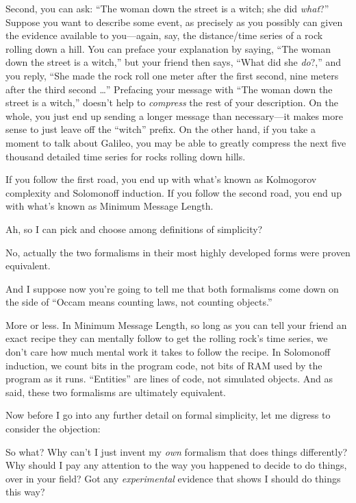 {
 Second, you can ask: ``The woman down the street
is a witch; she did \textit{what}?'' Suppose you want
to describe some event, as precisely as you possibly can given the
evidence available to you---again, say, the distance/time series of a
rock rolling down a hill. You can preface your explanation by saying,
``The woman down the street is a
witch,'' but your friend then says,
``What did she \textit{do}?,'' and
you reply, ``She made the rock roll one meter after
the first second, nine meters after the third second
\ldots'' Prefacing your message with
``The woman down the street is a
witch,'' doesn't help to
\textit{compress} the rest of your description. On the whole, you just
end up sending a longer message than necessary---it makes more sense to
just leave off the ``witch'' prefix.
On the other hand, if you take a moment to talk about Galileo, you may
be able to greatly compress the next five thousand detailed time series
for rocks rolling down hills.}

{
 If you follow the first road, you end up with
what's known as Kolmogorov complexity and Solomonoff
induction. If you follow the second road, you end up with
what's known as Minimum Message Length.}

{
 Ah, so I can pick and choose among definitions of simplicity?}

{
 No, actually the two formalisms in their most highly developed
forms were proven equivalent.}

{
 And I suppose now you're going to tell me that
both formalisms come down on the side of ``Occam means
counting laws, not counting objects.''}

{
 More or less. In Minimum Message Length, so long as you can tell
your friend an exact recipe they can mentally follow to get the rolling
rock's time series, we don't care how
much mental work it takes to follow the recipe. In Solomonoff
induction, we count bits in the program code, not bits of RAM used by
the program as it runs. ``Entities''
are lines of code, not simulated objects. And as said, these two
formalisms are ultimately equivalent.}

{
 Now before I go into any further detail on formal simplicity, let
me digress to consider the objection:}

{
 So what? Why can't I just invent my \textit{own}
formalism that does things differently? Why should I pay any attention
to the way you happened to decide to do things, over in your field? Got
any \textit{experimental} evidence that shows I should do things this
way?}

